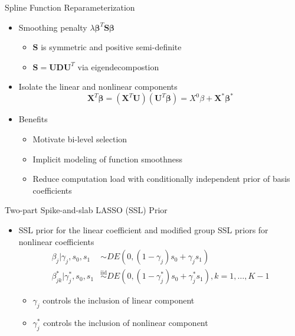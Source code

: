 \documentclass[
  ignorenonframetext,
  aspectratio=169]{beamer}
\providecommand{\tightlist}{%
  \setlength{\itemsep}{0pt}\setlength{\parskip}{0pt}}
\newcommand{\bs}[1]{\boldsymbol{#1}}
\newcommand{\tp}{*}
\newcommand{\simiid}{\overset{\text{iid}}{\sim}}
\begin{document}
\begin{frame}{Spline Function Reparameterization}
\protect\hypertarget{spline-function-reparameterization}{}
\begin{itemize}
\item
  Smoothing penalty \(\lambda \bs \beta^T \bs S \bs \beta\)

  \begin{itemize}
  \tightlist
  \item
    \(\bs S\) is symmetric and positive semi-definite
  \item
    \(\bs S = \bm U \bm D \bm U^T\) via eigendecompostion
  \end{itemize}
\item
  Isolate the linear and nonlinear components
  \[\bm X^T \bm \beta = (\bm X^T \bm U) (\bm U^T \bm \beta)= X^{0} \beta + \bs X^\tp \bs \beta^\tp\]
\item
  Benefits

  \begin{itemize}
  \tightlist
  \item
    Motivate bi-level selection
  \item
    Implicit modeling of function smoothness
  \item
    Reduce computation load with conditionally independent prior of
    basis coefficients
  \end{itemize}
\end{itemize}
\end{frame}

\begin{frame}{Two-part Spike-and-slab LASSO (SSL) Prior}
\protect\hypertarget{two-part-spike-and-slab-lasso-ssl-prior}{}
\begin{itemize}
\item
  SSL prior for the linear coefficient and modified group SSL priors for
  nonlinear coefficients \begin{align*}
  \beta_{j} |\gamma_{j},s_0,s_1 &\sim DE(0,(1-\gamma_{j}) s_0 + \gamma_{j} s_1) \\
  \beta^\tp_{jk} | \gamma^\tp_{j},s_0,s_1 &\simiid DE(0,(1-\gamma^\tp_{j}) s_0 + \gamma^\tp_{j} s_1), k = 1, \dots, K-1
  \end{align*}

  \begin{itemize}
  \tightlist
  \item
    \(\gamma_{j}\) controls the inclusion of linear component
  \item
    \(\gamma_{j}^\tp\) controls the inclusion of nonlinear component
  \end{itemize}
\end{itemize}
\end{frame}
\end{document}
